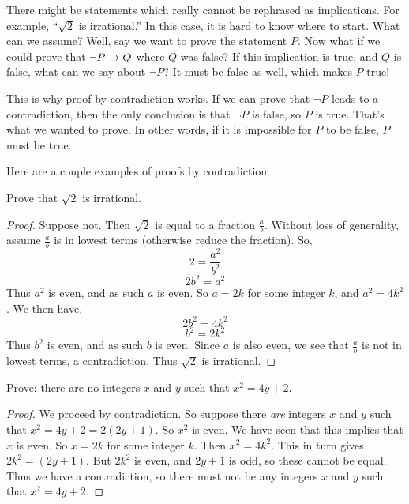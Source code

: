 \documentclass[12pt]{article}
\begin{document}
There might be statements which really cannot be rephrased as implications.  For example, ``$\sqrt 2$ is irrational.''  In this case, it is hard to know where to start. What can we assume? Well, say we want to prove the statement $P$.  Now what if we could prove that $\neg P \rightarrow Q$ where $Q$ was false?  If this implication is true, and $Q$ is false, what can we say about $\neg P$?  It must be false as well, which makes $P$ true!  
   
 This is why proof by contradiction works.  If we can prove that $\neg P$ leads to a contradiction, then the only conclusion is that $\neg P$ is false, so $P$ is true.  That's what we wanted to prove.  In other words, if it is impossible for $P$ to be false, $P$ must be true.
 
 Here are a couple examples of proofs by contradiction.
   
   \begin{example}Prove that $\sqrt{2}$ is irrational.
   
   \begin{proof}
 	Suppose not.  Then $\sqrt 2$ is equal to a fraction $\frac{a}{b}$.  Without loss of generality, assume $\frac{a}{b}$ is in lowest terms (otherwise reduce the fraction).  So,
 	\[2 = \frac{a^2}{b^2}\]
 	\[2b^2 = a^2\]
 	Thus $a^2$ is even, and as such $a$ is even.  So $a = 2k$ for some integer $k$, and $a^2 = 4k^2$.  We then have,
 	\[2b^2 = 4k^2\]
 	\[b^2 = 2k^2\]
 	Thus $b^2$ is even, and as such $b$ is even.  Since $a$ is also even, we see that $\frac{a}{b}$ is not in lowest terms, a contradiction.  Thus $\sqrt 2$ is irrational.
 \end{proof}
  \end{example}
  
\begin{example} Prove: there are no integers $x$ and $y$ such that $x^2  = 4y + 2$. 
 \begin{proof}
 	We proceed by contradiction.  So suppose there {\em are} integers $x$ and $y$ such that $x^2 = 4y + 2 = 2(2y + 1)$.  So $x^2$ is even.  We have seen that this implies that $x$ is even.  So $x = 2k$ for some integer $k$.  Then $x^2 = 4k^2$.  This in turn gives
 	$2k^2 = (2y + 1)$.  But $2k^2$ is even, and $2y + 1$ is odd, so these cannot be equal.  Thus we have a contradiction, so there must not be any integers $x$ and $y$ such that $x^2 = 4y + 2$.
 \end{proof}
 \end{example}
 
\end{document}
